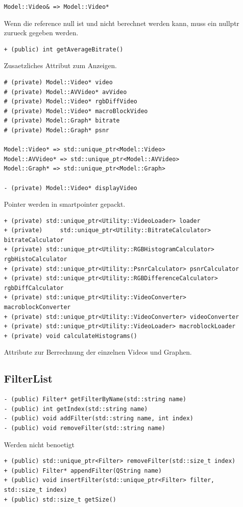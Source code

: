 \documentclass{scrartcl}
\begin{document}
{\begin{verbatim}
Model::Video& => Model::Video*
\end{verbatim}
Wenn die reference null ist und nicht berechnet werden kann, muss ein nullptr zurueck gegeben werden.

\begin{verbatim}
+ (public) int getAverageBitrate()
\end{verbatim}
Zusaetzliches Attribut zum Anzeigen.
\begin{verbatim}
# (private) Model::Video* video
# (private) Model::AVVideo* avVideo
# (private) Model::Video* rgbDiffVideo
# (private) Model::Video* macroBlockVideo
# (private) Model::Graph* bitrate
# (private) Model::Graph* psnr

Model::Video* => std::unique_ptr<Model::Video>
Model::AVVideo* => std::unique_ptr<Model::AVVideo>
Model::Graph* => std::unique_ptr<Model::Graph>

- (private) Model::Video* displayVideo
\end{verbatim}
Pointer werden in smartpointer gepackt.
\begin{verbatim}
+ (private) std::unique_ptr<Utility::VideoLoader> loader
+ (private) 	std::unique_ptr<Utility::BitrateCalculator> bitrateCalculator
+ (private) std::unique_ptr<Utility::RGBHistogramCalculator> rgbHistoCalculator
+ (private) std::unique_ptr<Utility::PsnrCalculator> psnrCalculator
+ (private) std::unique_ptr<Utility::RGBDifferenceCalculator> rgbDiffCalculator
+ (private) std::unique_ptr<Utility::VideoConverter> macroblockConverter
+ (private) std::unique_ptr<Utility::VideoConverter> videoConverter
+ (private) std::unique_ptr<Utility::VideoLoader> macroblockLoader
+ (private) void calculateHistograms()
\end{verbatim}
Attribute zur Berrechnung der einzelnen Videos und Graphen.
\subsection{FilterList}
\begin{verbatim}
- (public) Filter* getFilterByName(std::string name)
- (public) int getIndex(std::string name)
- (public) void addFilter(std::string name, int index)
- (public) void removeFilter(std::string name)
\end{verbatim}
Werden nicht benoetigt
\begin{verbatim}
+ (public) std::unique_ptr<Filter> removeFilter(std::size_t index)
+ (public) Filter* appendFilter(QString name)
+ (public) void insertFilter(std::unique_ptr<Filter> filter, std::size_t index)
+ (public) std::size_t getSize()


\end{verbatim}}
\end{document}
